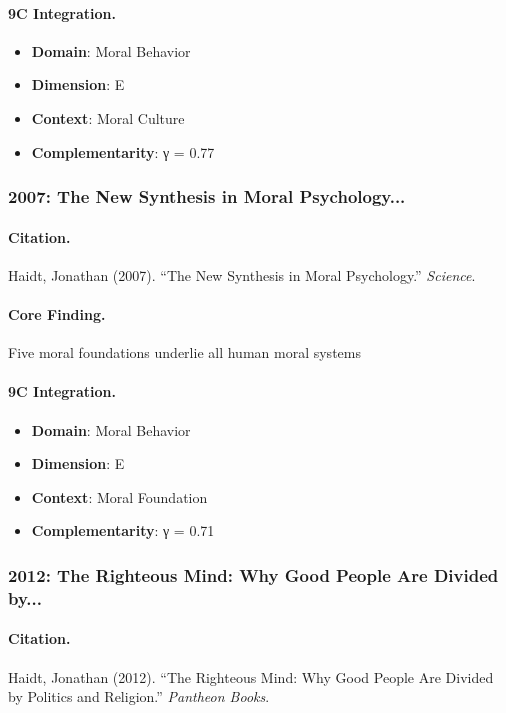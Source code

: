 \paragraph{9C Integration.}
\begin{itemize}[nosep]
  \item \textbf{Domain}: Moral Behavior
  \item \textbf{Dimension}: E
  \item \textbf{Context}: Moral Culture
  \item \textbf{Complementarity}: γ = 0.77
\end{itemize}

\subsubsection{2007: The New Synthesis in Moral Psychology...}

\paragraph{Citation.}
Haidt, Jonathan (2007). ``The New Synthesis in Moral Psychology.''
\textit{Science}.

\paragraph{Core Finding.}
Five moral foundations underlie all human moral systems

\paragraph{9C Integration.}
\begin{itemize}[nosep]
  \item \textbf{Domain}: Moral Behavior
  \item \textbf{Dimension}: E
  \item \textbf{Context}: Moral Foundation
  \item \textbf{Complementarity}: γ = 0.71
\end{itemize}

\subsubsection{2012: The Righteous Mind: Why Good People Are Divided by...}

\paragraph{Citation.}
Haidt, Jonathan (2012). ``The Righteous Mind: Why Good People Are Divided by Politics and Religion.''
\textit{Pantheon Books}.

